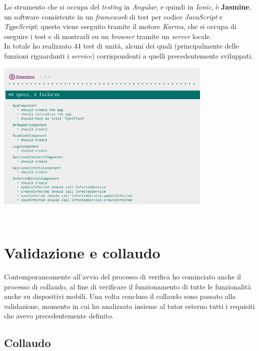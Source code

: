 Lo strumento che si occupa del \textit{testing} in \textit{Angular}, e quindi in \textit{Ionic}, è \textbf{Jasmine}, un software consistente in un \textit{framework} di test per codice \textit{JavaScript} e \textit{TypeScript}; questo viene eseguito tramite il motore \textit{Karma}, che si occupa di eseguire i test e di mostrarli su un \textit{browser} tramite un \textit{server} locale. \\
In totale ho realizzato 44 test di unità, alcuni dei quali (principalmente delle funzioni riguardanti i \textit{service}) corrispondenti a quelli precedentemente sviluppati. \\

\begin{minipage}{\linewidth}
  \centering
    \includegraphics[height=7.2cm]{immagini/jasminekarma}
\end{minipage} \\



\section{Validazione e collaudo}

Contemporaneamente all'avvio del processo di verifica ho cominciato anche il processo di collaudo, al fine di verificare il funzionamento di tutte le funzionalità anche su dispositivi mobili. Una volta concluso il collaudo sono passato alla validazione, momento in cui ho analizzato insieme al tutor esterno tutti i requisiti che avevo precedentemente definito.

\subsection*{Collaudo}

